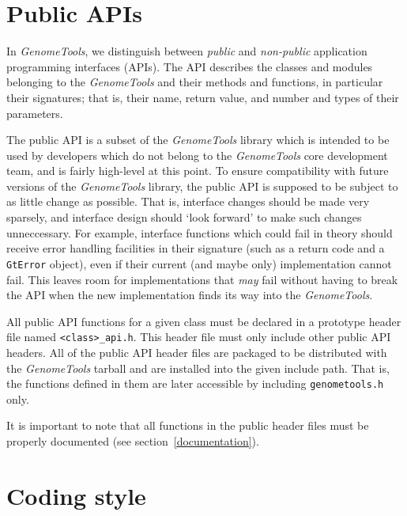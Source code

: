 \documentclass[11pt,final]{article}
\newcommand{\keyword}[1]{\lstinline{#1}}
\newcommand{\Gt}[0]{\emph{GenomeTools}\xspace}
\begin{document}
\section{Public APIs}

In \Gt , we distinguish between \emph{public} and \emph{non-public} application
programming interfaces (APIs). The API describes the classes and modules
belonging to the \Gt and their methods and functions, in particular their
signatures; that is, their name, return value, and number and types of their
parameters.

The public API is a subset of the \Gt library which is intended to be used by
developers which do not belong to the \Gt core development team, and is fairly
high-level at this point. To ensure compatibility with future versions of the
\Gt library, the public API is supposed to be subject to as little change as
possible. That is, interface changes should be made very sparsely, and interface
design should `look forward' to make such changes unneccessary. For example,
interface functions which could fail in theory should receive error handling facilities
in their signature (such as a return code and a \keyword{GtError} object), even
if their current (and maybe only) implementation cannot fail. This leaves room
for implementations that \emph{may} fail without having to break the API when
the new implementation finds its way into the \Gt .

All public API functions for a given class must be declared in a prototype
header file named \keyword{<class>_api.h}. This header file must only include
other public API headers. All of the public API header files are packaged to be
distributed with the \Gt tarball and are installed into the given include path.
That is, the functions defined in them are later accessible by including
\keyword{genometools.h} only.

It is important to note that all functions in the public header files must be
properly documented (see section~\ref{documentation}).

\section{Coding style}
\end{document}
